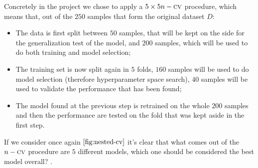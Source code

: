 Concretely in the project we chose to apply a $5 \times 5 n-\textsc{cv}$ procedure, which means that, out of
the $250$ samples that form the original dataset $D$:
\begin{itemize}
	\item The data is first split between $50$ samples, that will be kept on the side for the
	      generalization test of the model, and $200$ samples, which will be used to do both
	      training and model selection;
	\item The training set is now split again in $5$ folds, $160$ samples will be used to do
	      model selection (therefore hyperparameter space search), $40$ samples will be used
	      to validate the performance that has been found;
	\item The model found at the previous step is retrained on the whole $200$ samples and then
	      the performance are tested on the fold that was kept aside in the first step.
\end{itemize}
If we consider once again $\Cref{fig:nested-cv}$ it's clear that what comes out of the $n-\textsc{cv}$
procedure are $5$ different models, which one should be considered the best model overall? .











